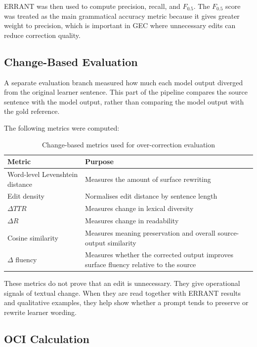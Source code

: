 ERRANT was then used to compute precision, recall, and $F_{0.5}$. The $F_{0.5}$ score was treated as the main grammatical accuracy metric because it gives greater weight to precision, which is important in GEC where unnecessary edits can reduce correction quality.

\subsection{Change-Based Evaluation}

A separate evaluation branch measured how much each model output diverged from the original learner sentence. This part of the pipeline compares the source sentence with the model output, rather than comparing the model output with the gold reference.

The following metrics were computed:

\begin{table}[htbp]
    \centering
    \caption{Change-based metrics used for over-correction evaluation}
    \label{tab:style_metrics}
    \begin{tabular}{|p{5cm}|p{8cm}|}
        \hline
        \textbf{Metric} & \textbf{Purpose} \\
        \hline
        Word-level Levenshtein distance & Measures the amount of surface rewriting \\
        \hline
        Edit density & Normalises edit distance by sentence length \\
        \hline
        $\Delta TTR$ & Measures change in lexical diversity \\
        \hline
        $\Delta R$ & Measures change in readability \\
        \hline
        Cosine similarity & Measures meaning preservation and overall source-output similarity \\
        \hline
        $\Delta$ fluency & Measures whether the corrected output improves surface fluency relative to the source \\
        \hline
    \end{tabular}
\end{table}

These metrics do not prove that an edit is unnecessary. They give operational signals of textual change. When they are read together with ERRANT results and qualitative examples, they help show whether a prompt tends to preserve or rewrite learner wording.

\subsection{OCI Calculation}

